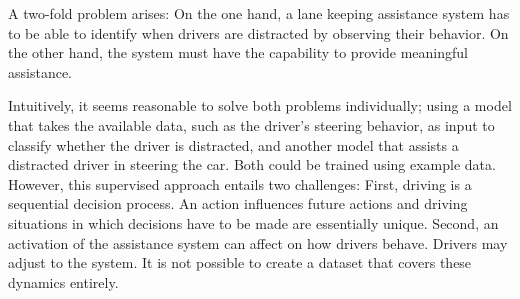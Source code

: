 


A two-fold problem arises: On the one hand, a lane keeping assistance system has to be able to identify when drivers are distracted by observing their behavior. On the other hand, the system must have the capability to provide meaningful assistance. 



Intuitively, it seems reasonable to solve both problems individually; using a model that takes the available data, such as the driver's steering behavior, as input to classify whether the driver is distracted, and another model that assists a distracted driver in steering the car. Both could be trained using example data. However, this supervised approach entails two challenges: First, driving is a sequential decision process. An action influences future actions and driving situations in which decisions have to be made are essentially unique. Second, an activation of the assistance system can affect on how drivers behave. Drivers may adjust to the system. It is not possible to create a dataset that covers these dynamics entirely.


